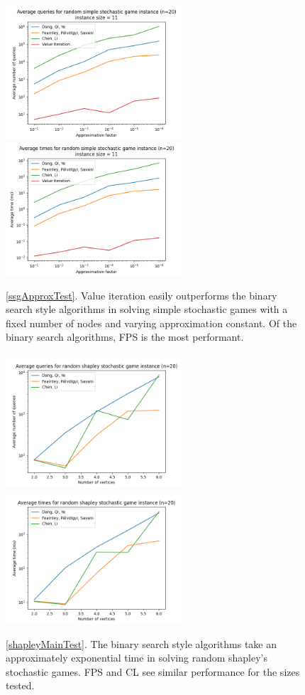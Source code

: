   \vspace{-20pt}
  \begin{figure}[H]
      \centering
      \includegraphics[width=2.6in]{plots/simple_eps_queries.png}
      \centering
      \includegraphics[width=2.6in]{plots/simple_eps_times.png}
      \caption{\cref{ssgApproxTest}. Value iteration easily outperforms the binary search style algorithms
      in solving simple stochastic games with a fixed number of nodes and varying approximation constant.
      Of the binary search algorithms, FPS is the most performant.} \label{simpleApproxPlot}
  \end{figure}
  \vspace{-20pt}
  \begin{figure}[H]
      \centering
      \includegraphics[width=2.6in]{plots/shapley_queries.png}
      \centering
      \includegraphics[width=2.6in]{plots/shapley_times.png}
      \caption{\cref{shapleyMainTest}. The binary search style algorithms take an approximately exponential
      time in solving random shapley's stochastic games. FPS and CL see similar performance for the
      sizes tested.} \label{shapleyMainPlot}
  \end{figure}
